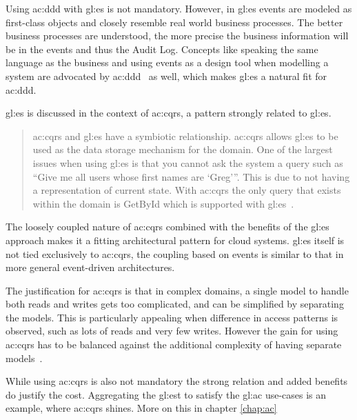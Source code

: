 
Using \gls{ac:ddd} with \gls{gl:es} is not mandatory. However, in \gls{gl:es} events are modeled as first-class objects and closely resemble real world business processes. The better business processes are understood, the more precise the business information will be in the events and thus the Audit Log. Concepts like speaking the same language as the business and using events as a design tool when modelling a system are advocated by \gls{ac:ddd}~\citep{evans2004domain} as well, which makes \gls{gl:es} a natural fit for \gls{ac:ddd}.


\gls{gl:es} is discussed in the context of \gls{ac:cqrs}, a pattern strongly related to \gls{gl:es}.

\begin{quote}
\gls{ac:cqrs} and \gls{gl:es} have a symbiotic relationship. \gls{ac:cqrs} allows \gls{gl:es} to be used as the
data storage mechanism for the domain. One of the largest issues when using \gls{gl:es} is that you
cannot ask the system a query such as “Give me all users whose first names are ‘Greg’”. This is due to
not having a representation of current state. With \gls{ac:cqrs} the only query that exists within the domain is
GetById which is supported with \gls{gl:es}~\citep{young2010cqrs}.
\end{quote}

The loosely coupled nature of \gls{ac:cqrs} combined with the benefits of the \gls{gl:es} approach makes it a fitting architectural pattern for cloud systems. \gls{gl:es} itself is not tied exclusively to \gls{ac:cqrs}, the coupling based on events is similar to that in more general event-driven architectures.

The justification for \gls{ac:cqrs} is that in complex domains, a single model to handle both reads and writes gets too complicated, and can be simplified by separating the models. This is particularly appealing when difference in access patterns is observed, such as lots of reads and very few writes. However the gain for using \gls{ac:cqrs} has to be balanced against the additional complexity of having separate models~\citep{esvsed}.

While using \gls{ac:cqrs} is also not mandatory the strong relation and added benefits do justify the cost. Aggregating the \gls{gl:est} to satisfy the \gls{gl:ac} use-cases is an example, where \gls{ac:cqrs} shines. More on this in chapter \ref{chap:ac}

